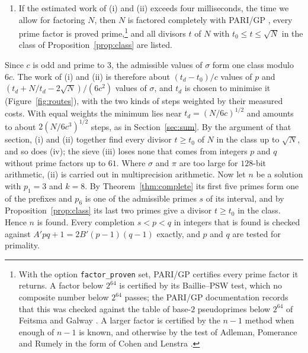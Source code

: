 \documentclass[screen,reqno]{aomart}
\numberwithin{equation}{section}
\theoremstyle{plain}
\theoremstyle{definition}
\theoremstyle{remark}
\begin{document}
\begin{enumerate}[label=\textup{(\roman*)}, leftmargin=*]
  particular every value that comes from primes.
\item If the estimated work of (i) and (ii) exceeds four milliseconds,
  the time we allow for factoring $N$, then $N$ is factored completely with
  PARI/GP \cite{PARI}, every prime factor is proved
  prime,\footnote{With the option \texttt{factor\_proven} set, PARI/GP
  certifies every prime factor it returns. A factor below $2^{64}$ is
  certified by its Baillie--PSW test, which no composite number below
  $2^{64}$ passes; the PARI/GP documentation records that this was
  checked against the table of base-$2$ pseudoprimes below $2^{64}$ of
  Feitsma and Galway \cite{FG}. A larger factor is certified by the
  $n-1$ method \cite{BLS75} when enough of $n-1$ is known, and
  otherwise by the test of Adleman, Pomerance and Rumely
  \cite{APR83} in the form of Cohen and Lenstra \cite{CL84}.} and all
  divisors $t$ of $N$ with $t_0\le t\le\sqrt N$ in the class of
  Proposition~\ref{prop:class} are listed.
\end{enumerate}
Since $c$ is odd and prime to $3$, the admissible values of $\sigma$
form one class modulo $6c$. The work of (i) and (ii) is therefore about
$(t_d-t_0)/c$ values of $p$ and $(t_d+N/t_d-2\sqrt N)/(6c^2)$ values of
$\sigma$, and $t_d$ is chosen to minimise it (Figure~\ref{fig:routes}),
with the two kinds of steps weighted by their measured costs. With equal weights the minimum
lies near $t_d=(N/6c)^{1/2}$ and amounts to about $2(N/6c^3)^{1/2}$
steps, as in Section~\ref{sec:sum}. By the argument of that section,
(i) and (ii) together find every divisor $t\ge t_0$ of $N$ in the class
up to $\sqrt N$, and so does (iv); the sieve (iii) loses none that
comes from integers $p$ and $q$ without prime factors up to $61$. Where
$\sigma$ and $\pi$ are too large for $128$-bit arithmetic, (ii) is
carried out in multiprecision arithmetic. Now let $n$ be a solution with
$p_1=3$ and $k=8$. By Theorem~\ref{thm:complete} its first five primes
form one of the prefixes and $p_6$ is one of the admissible primes $s$
of its interval, and by Proposition~\ref{prop:class} its last two
primes give a divisor $t\ge t_0$ in the class. Hence $n$ is found.
Every completion $s<p<q$ in integers that is found is checked against
$A'pq+1=2B'(p-1)(q-1)$ exactly, and $p$ and $q$ are tested for
primality.
\end{document}
